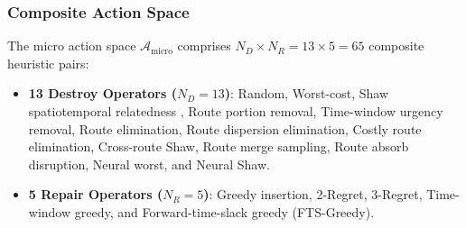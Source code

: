 \subsubsection{Composite Action Space}
The micro action space $\mathcal{A}_{\text{micro}}$ comprises $N_D \times N_R = 13 \times 5 = 65$ composite heuristic pairs:
\begin{itemize}
    \item \textbf{13 Destroy Operators ($N_D=13$)}: Random, Worst-cost, Shaw spatiotemporal relatedness \cite{shaw1998using}, Route portion removal, Time-window urgency removal, Route elimination, Route dispersion elimination, Costly route elimination, Cross-route Shaw, Route merge sampling, Route absorb disruption, Neural worst, and Neural Shaw.
    \item \textbf{5 Repair Operators ($N_R=5$)}: Greedy insertion, 2-Regret, 3-Regret, Time-window greedy, and Forward-time-slack greedy (FTS-Greedy).
\end{itemize}

